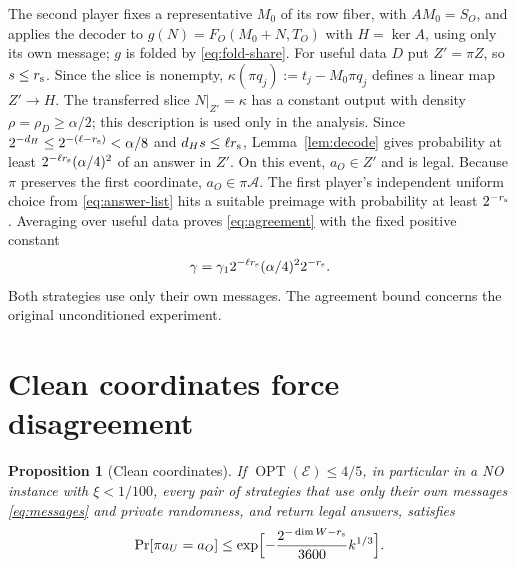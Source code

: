 \documentclass[11pt]{article}
\newtheorem{proposition}[theorem]{Proposition}
\newcommand{\OPT}{\operatorname{OPT}}
\begin{document}
The second player fixes a representative $M_0$ of its row fiber, with
$AM_0=S_O$, and applies the decoder to $g(N)=F_O(M_0+N,T_O)$ with $H=\ker A$, using only its
own message; $g$ is folded by \eqref{eq:fold-share}. For useful data $D$
put $Z'=\pi Z$, so $s\le r_{\rm s}$. Since the slice is nonempty,
$\kappa(\pi q_j):=t_j-M_0\pi q_j$ defines a linear map $Z'\to H$. The
transferred slice $N|_{Z'}=\kappa$ has a constant output with density
$\rho=\rho_D\ge\alpha/2$; this description is
used only in the analysis. Since
$2^{-d_H}\le2^{-(\ell-r_{\rm s})}<\alpha/8$ and $d_Hs\le\ell r_{\rm s}$,
Lemma~\ref{lem:decode} gives probability at least
$2^{-\ell r_{\rm s}}(\alpha/4)^2$ of an answer in $Z'$.
On this event, $a_O\in Z'$ and is legal. Because $\pi$ preserves the first
coordinate, $a_O\in\pi\mathcal A$. The first player's independent uniform
choice from \eqref{eq:answer-list} hits a suitable preimage with probability
at least $2^{-r_{\rm s}}$. Averaging over useful data proves \eqref{eq:agreement}
with the fixed positive constant
\begin{equation}\label{eq:gamma}
 \gamma=\gamma_1 2^{-\ell r_{\rm s}}(\alpha/4)^2 2^{-r_{\rm s}}.
\end{equation}
Both strategies use only their own messages. The agreement bound concerns
the original unconditioned experiment.


\section{Clean coordinates force disagreement}\label{sec:clean}

\begin{proposition}[Clean coordinates]\label{prop:clean}
If $\OPT(\mathcal E)\le4/5$, in particular in a NO instance with $\xi<1/100$,
\emph{every} pair of strategies that use only their own
messages \eqref{eq:messages} and private randomness, and return legal
answers, satisfies
\[
 \Pr[\pi a_U=a_O]\le
 \exp\Bigl[-\frac{2^{-\dim W-r_{\rm s}}}{3600}k^{1/3}\Bigr].
\]
\end{proposition}
\end{document}
